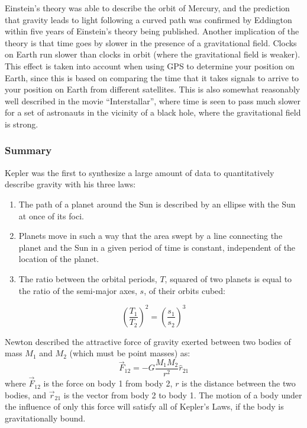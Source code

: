 Einstein's theory was able to describe the orbit of Mercury, and the prediction that gravity leads to light following a curved path was confirmed by Eddington within five years of Einstein's theory being published. Another implication of the theory is that time goes by slower in the presence of a gravitational field. Clocks on Earth run slower than clocks in orbit (where the gravitational field is weaker). This effect is taken into account when using GPS to determine your position on Earth, since this is based on comparing the time that it takes signals to arrive to your position on Earth from different satellites. This is also somewhat reasonably well described in the movie ``Interstallar'', where time is seen to pass much slower for a set of astronauts in the vicinity of a black hole, where the gravitational field is strong.

\subsubsection{Summary}

Kepler was the first to synthesize a large amount of data to quantitatively describe gravity with his three laws:

\begin{enumerate}
\item The path of a planet around the Sun is described by an ellipse with the Sun at once of its foci.
\item Planets move in such a way that the area swept by a line connecting the planet and the Sun in a given period of time is constant, independent of the location of the planet.
\item The ratio between the orbital periods, $T$, squared of two planets is equal to the ratio of the semi-major axes, $s$, of their orbits cubed:
\end{enumerate}
\begin{equation}
\left(\frac{T_1}{T_2}\right)^2=\left(\frac{s_1}{s_2}\right)^3
\end{equation}

Newton described the attractive force of gravity exerted between two bodies of mass $M_1$ and $M_2$ (which must be point masses) as:
\begin{equation}
\vec F_{12}=-G\frac{M_1M_2}{r^2}\hat r_{21}
\end{equation}
where $\vec F_{12}$ is the force on body 1 from body 2, $r$ is the distance between the two bodies, and $\vec r_{21}$ is the vector from body 2 to body 1. The motion of a body under the influence of only this force will satisfy all of Kepler's Laws, if the body is gravitationally bound.

